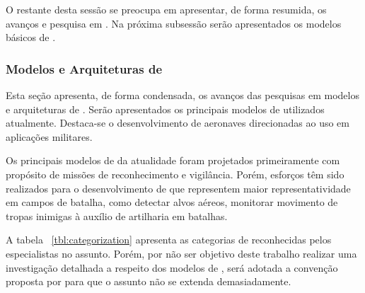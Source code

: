 O restante desta sessão se preocupa em apresentar, de forma resumida, os avanços e pesquisa em \uavs. Na próxima subsessão serão apresentados os modelos básicos de \vants.

\subsubsection{Modelos e Arquiteturas de \vants}

Esta seção apresenta, de forma condensada, os avanços das pesquisas em modelos e arquiteturas de \uavs. Serão apresentados os principais modelos de \vants utilizados atualmente. Destaca-se o desenvolvimento de aeronaves direcionadas ao uso em aplicações militares.

Os principais modelos de \vants da atualidade foram projetados primeiramente com propósito de missões de reconhecimento e vigilância. Porém, esforços têm sido realizados para o desenvolvimento de \vants que representem maior representatividade em campos de batalha, como detectar alvos aéreos, monitorar movimento de tropas inimigas à auxílio de artilharia em batalhas. \cite{Bone2003}

A tabela ~\ref{tbl:categorization} apresenta as categorias de \vants reconhecidas pelos especialistas no assunto. Porém, por não ser objetivo deste trabalho realizar uma investigação detalhada a respeito dos modelos de \vants, será adotada a convenção proposta por \cite{Drew2005} para que o assunto não se extenda demasiadamente.

